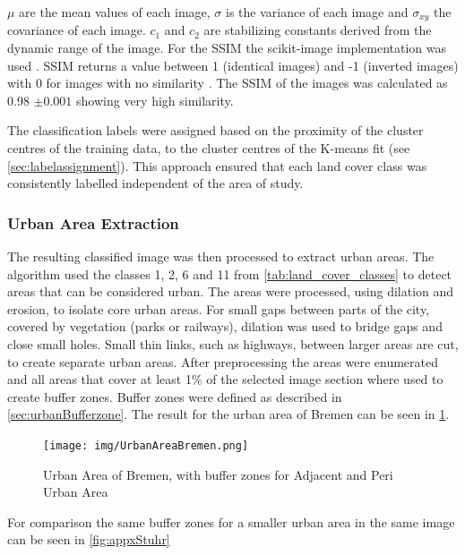 \documentclass[12pt,a4paper, english,twoside]{scrartcl}
\begin{document}
      $\mu$ are the mean values of each image, $\sigma$ is the variance of each image and $\sigma_{xy}$ the covariance of each image. $c_{1}$ and $c_{2}$ are stabilizing constants derived from the dynamic range of the image\cite[Equation 6]{Wang2003}.
      For the SSIM the scikit-image implementation was used \autocite{Walt2014}.
      \Gls{SSIM} returns a value between 1 (identical images) and -1 (inverted images) with 0 for images with no similarity \autocite{Wang2003}. 
      The \gls{SSIM} of the images was calculated as 0.98 $\pm 0.001$ showing very high similarity.



      \noindent
      The classification labels were assigned based on the proximity of the cluster centres of the training data, to the cluster centres of the K-means fit (see \cref{sec:labelassignment}).
      This approach ensured that each land cover class was consistently labelled independent of the area of study.
    \subsubsection{Urban Area Extraction}\label{sec:urbanAreaExtraction}
      The resulting classified image was then processed to extract urban areas.
      The algorithm used the classes 1, 2, 6 and 11 from \cref{tab:land_cover_classes} to detect areas that can be considered urban.
      The areas were processed, using \gls{dilation} and \gls{erosion}, to isolate core urban areas. 
      For small gaps between parts of the city, covered by vegetation (parks or railways), dilation was used to bridge gaps and close small holes.
      Small thin links, such as highways, between larger areas are cut, to create separate urban areas.
      After preprocessing the areas were enumerated and all areas that cover at least 1\% of the selected image section where used to create buffer zones. 
      Buffer zones were defined as described in \cref{sec:urbanBufferzone}. 
      The result for the urban area of Bremen can be seen in \cref{fig:bufferedBremen}.\\
      \begin{figure}[!htbp]
        \texttt{[image: img/UrbanAreaBremen.png]}
        \caption{Urban Area of Bremen, with buffer zones for Adjacent and Peri Urban Area\label{fig:bufferedBremen}}
      \end{figure}
      For comparison the same buffer zones for a smaller urban area in the same image can be seen in \cref{fig:appxStuhr}
      
\end{document}
